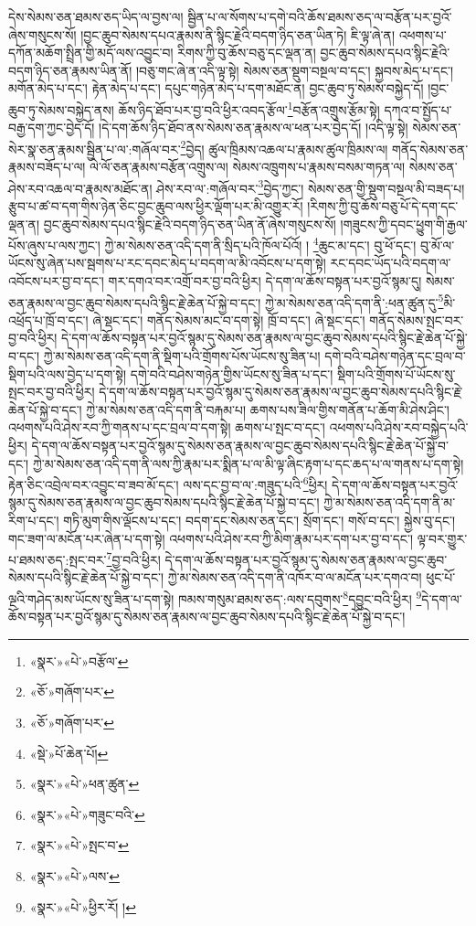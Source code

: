 དེས་སེམས་ཅན་ཐམས་ཅད་ཡིད་ལ་བྱས་ལ། སྦྱིན་པ་ལ་སོགས་པ་དགེ་བའི་ཆོས་ཐམས་ཅད་ལ་བརྩོན་པར་བྱའོ་ཞེས་གསུངས་སོ། །བྱང་ཆུབ་སེམས་དཔའ་རྣམས་ནི་སྙིང་རྗེའི་བདག་ཉིད་ཅན་ཡིན་ཏེ། ཇི་ལྟ་ཞེ་ན། འཕགས་པ་དཀོན་མཆོག་སྤྲིན་གྱི་མདོ་ལས་འབྱུང་བ། རིགས་ཀྱི་བུ་ཆོས་བཅུ་དང་ལྡན་ན། བྱང་ཆུབ་སེམས་དཔའ་སྙིང་རྗེའི་བདག་ཉིད་ཅན་རྣམས་ཡིན་ནོ། །བཅུ་གང་ཞེ་ན་འདི་ལྟ་སྟེ། སེམས་ཅན་སྡུག་བསྔལ་བ་དང་། སྐྱབས་མེད་པ་དང་། མགོན་མེད་པ་དང་། རྟེན་མེད་པ་དང་། དཔུང་གཉེན་མེད་པ་དག་མཐོང་ན། བྱང་ཆུབ་ཏུ་སེམས་བསྐྱེད་དོ། །བྱང་ཆུབ་ཏུ་སེམས་བསྐྱེད་ནས། ཆོས་ཉིད་ཐོབ་པར་བྱ་བའི་ཕྱིར་འབད་རྩོལ་\footnote{«སྣར་»«པེ་»བརྩོལ་}བརྩོན་འགྲུས་རྩོམ་སྟེ། དཀའ་བ་སྤྱོད་པ་བརྒྱ་དག་ཀྱང་བྱེད་དོ། །དེ་དག་ཆོས་ཉིད་ཐོབ་ནས་སེམས་ཅན་རྣམས་ལ་ཕན་པར་བྱེད་དོ། །འདི་ལྟ་སྟེ། སེམས་ཅན་སེར་སྣ་ཅན་རྣམས་སྦྱིན་པ་ལ་:གཞོལ་བར་\footnote{«ཅོ་»གཞོག་པར་}བྱེད། ཚུལ་ཁྲིམས་འཆལ་པ་རྣམས་ཚུལ་ཁྲིམས་ལ། གནོད་སེམས་ཅན་རྣམས་བཟོད་པ་ལ། ལེ་ལོ་ཅན་རྣམས་བརྩོན་འགྲུས་ལ། སེམས་འཁྲུགས་པ་རྣམས་བསམ་གཏན་ལ། སེམས་ཅན་ཤེས་རབ་འཆལ་བ་རྣམས་མཐོང་ན། ཤེས་རབ་ལ་:གཞོལ་བར་\footnote{«ཅོ་»གཞོག་པར་}བྱེད་ཀྱང་། སེམས་ཅན་གྱི་སྡུག་བསྔལ་མི་བཟད་པ། རྩུབ་པ་ཚ་བ་དག་གིས་ཉེན་ཅིང་བྱང་ཆུབ་ལས་ཕྱིར་ལྡོག་པར་མི་འགྱུར་རོ། །རིགས་ཀྱི་བུ་ཆོས་བཅུ་པོ་དེ་དག་དང་ལྡན་ན། བྱང་ཆུབ་སེམས་དཔའ་སྙིང་རྗེའི་བདག་ཉིད་ཅན་ཡིན་ནོ་ཞེས་གསུངས་སོ། །གཟུངས་ཀྱི་དབང་ཕྱུག་གི་རྒྱལ་པོས་ཞུས་པ་ལས་ཀྱང་། ཀྱེ་མ་སེམས་ཅན་འདི་དག་ནི་སྲིད་པའི་ཁོལ་པོའོ། ། \footnote{«སྡེ་»པོ་ཆེན་པོ། }ཆུང་མ་དང་། བུ་ཕོ་དང་། བུ་མོ་ལ་ཡོངས་སུ་ཞེན་པས་སྦགས་པ་རང་དབང་མེད་པ་བདག་ལ་མི་འབོངས་པ་དག་སྟེ། རང་དབང་ཡོད་པའི་བདག་ལ་འབོངས་པར་བྱ་བ་དང་། གར་དགའ་བར་འགྲོ་བར་བྱ་བའི་ཕྱིར། དེ་དག་ལ་ཆོས་བསྟན་པར་བྱའོ་སྙམ་དུ། སེམས་ཅན་རྣམས་ལ་བྱང་ཆུབ་སེམས་དཔའི་སྙིང་རྗེ་ཆེན་པོ་སྐྱེ་བ་དང་། ཀྱེ་མ་སེམས་ཅན་འདི་དག་ནི་:ཕན་ཚུན་དུ་\footnote{«སྣར་»«པེ་»ཕན་ཚུན་}མི་འཕྲོད་པ་ཁྲོ་བ་དང་། ཞེ་སྡང་དང་། གནོད་སེམས་མང་བ་དག་སྟེ། ཁྲོ་བ་དང་། ཞེ་སྡང་དང་། གནོད་སེམས་སྤང་བར་བྱ་བའི་ཕྱིར། དེ་དག་ལ་ཆོས་བསྟན་པར་བྱའོ་སྙམ་དུ་སེམས་ཅན་རྣམས་ལ་བྱང་ཆུབ་སེམས་དཔའི་སྙིང་རྗེ་ཆེན་པོ་སྐྱེ་བ་དང་། ཀྱེ་མ་སེམས་ཅན་འདི་དག་ནི་སྡིག་པའི་གྲོགས་པོས་ཡོངས་སུ་ཟིན་པ། དགེ་བའི་བཤེས་གཉེན་དང་བྲལ་བ་སྡིག་པའི་ལས་བྱེད་པ་དག་སྟེ། དགེ་བའི་བཤེས་གཉེན་གྱིས་ཡོངས་སུ་ཟིན་པ་དང་། སྡིག་པའི་གྲོགས་པོ་ཡོངས་སུ་སྤང་བར་བྱ་བའི་ཕྱིར། དེ་དག་ལ་ཆོས་བསྟན་པར་བྱའོ་སྙམ་དུ་སེམས་ཅན་རྣམས་ལ་བྱང་ཆུབ་སེམས་དཔའི་སྙིང་རྗེ་ཆེན་པོ་སྐྱེ་བ་དང་། ཀྱེ་མ་སེམས་ཅན་འདི་དག་ནི་བརྐམ་པ། ཆགས་པས་ཟིལ་གྱིས་གནོན་པ་ཆོག་མི་ཤེས་ཤིང་། འཕགས་པའི་ཤེས་རབ་ཀྱི་གནས་པ་དང་བྲལ་བ་དག་སྟེ། ཆགས་པ་སྤང་བ་དང་། འཕགས་པའི་ཤེས་རབ་བསྐྱེད་པའི་ཕྱིར། དེ་དག་ལ་ཆོས་བསྟན་པར་བྱའོ་སྙམ་དུ་སེམས་ཅན་རྣམས་ལ་བྱང་ཆུབ་སེམས་དཔའི་སྙིང་རྗེ་ཆེན་པོ་སྐྱེ་བ་དང་། ཀྱེ་མ་སེམས་ཅན་འདི་དག་ནི་ལས་ཀྱི་རྣམ་པར་སྨིན་པ་ལ་མི་ལྟ་ཞིང་རྟག་པ་དང་ཆད་པ་ལ་གནས་པ་དག་སྟེ། རྟེན་ཅིང་འབྲེལ་བར་འབྱུང་བ་ཟབ་མོ་དང་། ལས་དང་བྱ་བ་ལ་:གཟུད་པའི་\footnote{«སྣར་»«པེ་»གཟུང་བའི་}ཕྱིར། དེ་དག་ལ་ཆོས་བསྟན་པར་བྱའོ་སྙམ་དུ་སེམས་ཅན་རྣམས་ལ་བྱང་ཆུབ་སེམས་དཔའི་སྙིང་རྗེ་ཆེན་པོ་སྐྱེ་བ་དང་། ཀྱེ་མ་སེམས་ཅན་འདི་དག་ནི་མ་རིག་པ་དང་། གཏི་མུག་གིས་ལྡོངས་པ་དང་། བདག་དང་སེམས་ཅན་དང་། སྲོག་དང་། གསོ་བ་དང་། སྐྱེས་བུ་དང་། གང་ཟག་ལ་མངོན་པར་ཞེན་པ་དག་སྟེ། འཕགས་པའི་ཤེས་རབ་ཀྱི་མིག་རྣམ་པར་དག་པར་བྱ་བ་དང་། ལྟ་བར་གྱུར་པ་ཐམས་ཅད་:སྤང་བར་\footnote{«སྣར་»«པེ་»སྤང་བ་}བྱ་བའི་ཕྱིར། དེ་དག་ལ་ཆོས་བསྟན་པར་བྱའོ་སྙམ་དུ་སེམས་ཅན་རྣམས་ལ་བྱང་ཆུབ་སེམས་དཔའི་སྙིང་རྗེ་ཆེན་པོ་སྐྱེ་བ་དང་། ཀྱེ་མ་སེམས་ཅན་འདི་དག་ནི་འཁོར་བ་ལ་མངོན་པར་དགའ་བ། ཕུང་པོ་ལྔའི་གཤེད་མས་ཡོངས་སུ་ཟིན་པ་དག་སྟེ། ཁམས་གསུམ་ཐམས་ཅད་:ལས་དབུགས་\footnote{«སྣར་»«པེ་»ལས་}དབྱུང་བའི་ཕྱིར། \footnote{«སྣར་»«པེ་»ཕྱིར་རོ། ། }དེ་དག་ལ་ཆོས་བསྟན་པར་བྱའོ་སྙམ་དུ་སེམས་ཅན་རྣམས་ལ་བྱང་ཆུབ་སེམས་དཔའི་སྙིང་རྗེ་ཆེན་པོ་སྐྱེ་བ་དང་། 